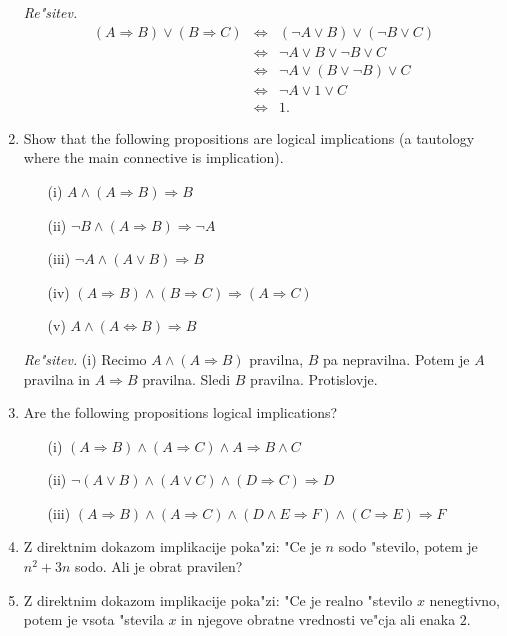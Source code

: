 \documentclass[11pt,paper=b5,footinclude,headinclude]{scrbook} %
\begin{document}
\begin{enumerate}
\emph{Re"sitev.} 
\begin{eqnarray*}
(A\Rightarrow B) \vee (B \Rightarrow C) &\Leftrightarrow & (\neg A \vee B) \vee (\neg B \vee C)\\
&\Leftrightarrow & \neg A \vee B \vee \neg B \vee C\\
&\Leftrightarrow & \neg A \vee (B \vee \neg B) \vee C\\
&\Leftrightarrow & \neg A \vee 1 \vee C\\
&\Leftrightarrow & 1.
\end{eqnarray*}

\item Show that the following propositions are logical implications (a tautology where the main connective is implication).
\begin{enumerate}
\item[(i)] $A \wedge (A \Rightarrow B) \Rightarrow B$
\item[(ii)] $\neg B \wedge (A \Rightarrow B) \Rightarrow \neg A$
\item[(iii)] $\neg A \wedge (A \vee B) \Rightarrow B$
\item[(iv)] $(A \Rightarrow B) \wedge (B \Rightarrow C) \Rightarrow (A \Rightarrow C)$
\item[(v)] $A \wedge (A \Leftrightarrow B) \Rightarrow B$
\end{enumerate}

\emph{Re"sitev.} (i) Recimo $A \wedge (A \Rightarrow B)$ pravilna, $B$ pa nepravilna. Potem je $A$ pravilna in $A\Rightarrow B$ pravilna. Sledi $B$ pravilna. Protislovje. 


\item Are the following propositions logical implications?
\begin{enumerate}
\item[(i)] $(A \Rightarrow B ) \wedge (A \Rightarrow C) \wedge A \Rightarrow B \wedge C$
\item[(ii)] $\neg (A \vee B) \wedge (A\vee C) \wedge (D\Rightarrow C) \Rightarrow D$
\item[(iii)] $(A\Rightarrow B) \wedge (A\Rightarrow C) \wedge (D\wedge E \Rightarrow F) \wedge (C\Rightarrow E) \Rightarrow F$
\end{enumerate}

\item Z direktnim dokazom implikacije poka"zi: "Ce je $n$ sodo "stevilo, potem je $n^2 +3n$ sodo. Ali je obrat pravilen? 

\item Z direktnim dokazom implikacije poka"zi: "Ce je realno "stevilo $x$ nenegtivno, potem je vsota  "stevila $x$  in njegove obratne vrednosti  ve"cja ali enaka $2$.



\end{enumerate}
\end{document}

